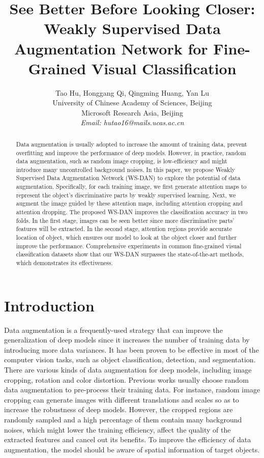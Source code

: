 \documentclass[10pt,twocolumn,letterpaper]{article}
\begin{document}
\title{See Better Before Looking Closer: Weakly Supervised Data Augmentation Network for Fine-Grained Visual Classification}

\author{
Tao Hu, Honggang Qi, Qingming Huang, Yan Lu\\
 University of Chinese Academy of Sciences, Beijing\\
 Microsoft Research Asia, Beijing\\
\textit {Email: hutao16@mails.ucas.ac.cn}
}

\maketitle



\begin{abstract}
Data augmentation is usually adopted to increase the amount of training data, prevent overfitting and improve the performance of deep models. However, in practice, random data augmentation, such as random image cropping, is low-efficiency and might introduce many uncontrolled background noises. In this paper, we propose Weakly Supervised Data Augmentation Network (WS-DAN) to explore the potential of data augmentation. Specifically, for each training image, we first generate attention maps to represent the object's discriminative parts by weakly supervised learning. Next, we augment the image guided by these attention maps, including attention cropping and attention dropping. The proposed WS-DAN improves the classification accuracy in two folds. In the first stage, images can be seen better since more discriminative parts' features will be extracted. In the second stage, attention regions provide accurate location of object, which ensures our model to look at the object closer and further improve the performance. Comprehensive experiments in common fine-grained visual classification datasets show that our WS-DAN surpasses the state-of-the-art methods, which demonstrates its effectiveness.
\end{abstract}

\section{Introduction}
\label{sec:introduction}
Data augmentation is a frequently-used strategy that can improve the generalization of deep models since it increases the number of training data by introducing more data variances. It has been proven to be effective in most of the computer vision tasks, such as object classification, detection, and segmentation. There are various kinds of data augmentation for deep models, including image cropping, rotation and color distortion. Previous works usually choose random data augmentation to pre-process their training data. For instance, random image cropping can generate images with different translations and scales so as to increase the robustness of deep models. However, the cropped regions are randomly sampled and a high percentage of them contain many background noises, which might lower the training efficiency, affect the quality of the extracted features and cancel out its benefits. To improve the efficiency of data augmentation, the model should be aware of spatial information of target objects.
\end{document}
